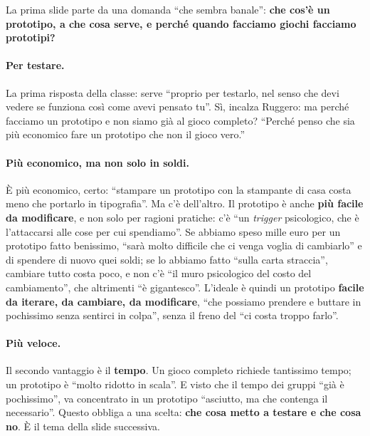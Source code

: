 La prima slide parte da una domanda ``che sembra banale'': \textbf{che cos'è un
prototipo, a che cosa serve, e perché quando facciamo giochi facciamo prototipi?}

\paragraph{Per testare.} La prima risposta della classe: serve ``proprio per testarlo,
nel senso che devi vedere se funziona così come avevi pensato tu''. Sì, incalza Ruggero:
ma perché facciamo un prototipo e non siamo già al gioco completo? ``Perché penso che
sia più economico fare un prototipo che non il gioco vero.''

\paragraph{Più economico, ma non solo in soldi.} È più economico, certo: ``stampare un
prototipo con la stampante di casa costa meno che portarlo in tipografia''. Ma c'è
dell'altro. Il prototipo è anche \textbf{più facile da modificare}, e non solo per
ragioni pratiche: c'è ``un \emph{trigger} psicologico, che è l'attaccarsi alle cose per
cui spendiamo''. Se abbiamo speso mille euro per un prototipo fatto benissimo, ``sarà
molto difficile che ci venga voglia di cambiarlo'' e di spendere di nuovo quei soldi; se
lo abbiamo fatto ``sulla carta straccia'', cambiare tutto costa poco, e non c'è ``il
muro psicologico del costo del cambiamento'', che altrimenti ``è gigantesco''. L'ideale
è quindi un prototipo \textbf{facile da iterare, da cambiare, da modificare}, ``che
possiamo prendere e buttare in pochissimo senza sentirci in colpa'', senza il freno del
``ci costa troppo farlo''.

\paragraph{Più veloce.} Il secondo vantaggio è il \textbf{tempo}. Un gioco completo
richiede tantissimo tempo; un prototipo è ``molto ridotto in scala''. E visto che il
tempo dei gruppi ``già è pochissimo'', va concentrato in un prototipo ``asciutto, ma
che contenga il necessario''. Questo obbliga a una scelta: \textbf{che cosa metto a
testare e che cosa no}. È il tema della slide successiva.

